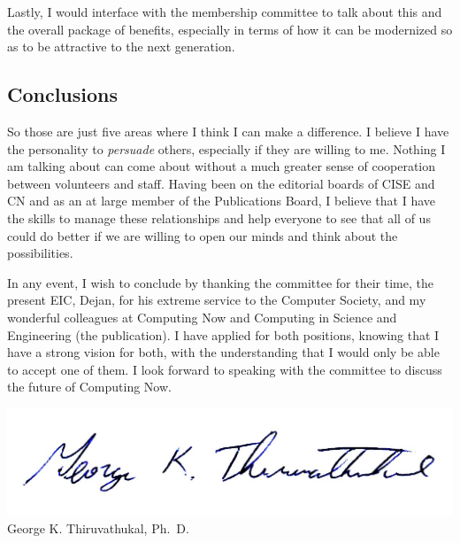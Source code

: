 \documentclass[11pt,english]{luclet}
\begin{document}
Lastly, I would interface with the membership committee to talk about
this and the overall package of benefits, especially in terms of how it
can be modernized so as to be attractive to the next generation.

\subsection{Conclusions}

So those are just five areas where I think I can make a difference. I
believe I have the personality to \emph{persuade} others, especially if
they are willing to me. Nothing I am talking about can come about
without a much greater sense of cooperation between volunteers and
staff. Having been on the editorial boards of CISE and CN and as an at
large member of the Publications Board, I believe that I have the skills
to manage these relationships and help everyone to see that all of us
could do better if we are willing to open our minds and think about the
possibilities.

In any event, I wish to conclude by thanking the committee for their
time, the present EIC, Dejan, for his extreme service to the Computer
Society, and my wonderful colleagues at Computing Now and Computing in
Science and Engineering (the publication). I have applied for both
positions, knowing that I have a strong vision for both, with the
understanding that I would only be able to accept one of them. I look
forward to speaking with the committee to discuss the future of
Computing Now.

\includegraphics[scale=0.7]{signature.jpg}\\
George K. Thiruvathukal, Ph.\ D.
\end{document}
